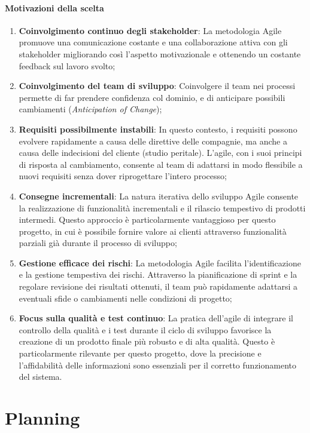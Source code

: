 \documentclass[a4paper,12pt, openright]{report}
\begin{document}
\subsubsection{Motivazioni della scelta}
\begin{enumerate}
    \item \textbf{Coinvolgimento continuo degli stakeholder}: La metodologia Agile promuove una comunicazione costante e una collaborazione attiva con gli stakeholder migliorando così l'aspetto motivazionale e ottenendo un costante feedback sul lavoro svolto;
    \item \textbf{Coinvolgimento del team di sviluppo}: Coinvolgere il team nei processi permette di far prendere confidenza col dominio, e di anticipare possibili cambiamenti (\textit{Anticipation of Change});
    \item \textbf{Requisiti possibilmente instabili}: In questo contesto, i requisiti possono evolvere rapidamente a causa delle direttive delle compagnie, ma anche a causa delle indecisioni del cliente (studio peritale). L'agile, con i suoi principi di risposta al cambiamento, consente al team di adattarsi in modo flessibile a nuovi requisiti senza dover riprogettare l'intero processo;
    \item \textbf{Consegne incrementali}: La natura iterativa dello sviluppo Agile consente la realizzazione di funzionalità incrementali e il rilascio tempestivo di prodotti intermedi. Questo approccio è particolarmente vantaggioso per questo progetto, in cui è possibile fornire valore ai clienti attraverso funzionalità parziali già durante il processo di sviluppo;
    \item \textbf{Gestione efficace dei rischi}: La metodologia Agile facilita l'identificazione e la gestione tempestiva dei rischi. Attraverso la pianificazione di sprint e la regolare revisione dei risultati ottenuti, il team può rapidamente adattarsi a eventuali sfide o cambiamenti nelle condizioni di progetto;
    \item \textbf{Focus sulla qualità e test continuo}: La pratica dell'agile di integrare il controllo della qualità e i test durante il ciclo di sviluppo favorisce la creazione di un prodotto finale più robusto e di alta qualità. Questo è particolarmente rilevante per questo progetto, dove la precisione e l'affidabilità delle informazioni sono essenziali per il corretto funzionamento del sistema.
\end{enumerate}


\chapter{Planning}
\end{document}
